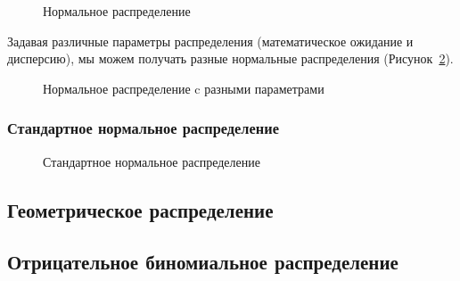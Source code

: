 \documentclass[
  letterpaper,
]{scrbook}
\theoremstyle{definition}
\theoremstyle{remark}
\begin{document}
\begin{figure}


\caption{\label{fig-norm}Нормальное распределение}

\end{figure}%

Задавая различные параметры распределения (математическое ожидание и
дисперсию), мы можем получать разные нормальные распределения
(Рисунок~\ref{fig-norms}).

\begin{figure}


\caption{\label{fig-norms}Нормальное распределение c разными
параметрами}

\end{figure}%

\subsubsection{Стандартное нормальное
распределение}\label{stats-rand-values-stnorm}

\begin{figure}


\caption{\label{fig-stnorm}Стандартное нормальное распределение}

\end{figure}%

\subsection{Геометрическое распределение}\label{stats-rand-values-geom}

\subsection{Отрицательное биномиальное
распределение}\label{stats-rand-values-negbinom}

\end{document}
